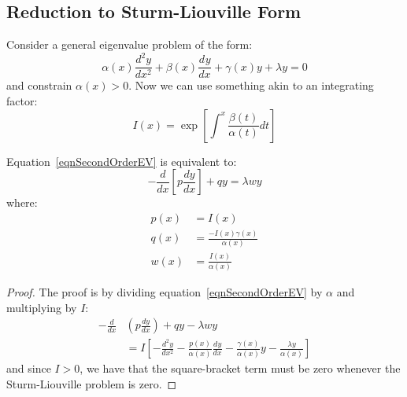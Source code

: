 \documentclass[../Main.tex]{subfiles}
\begin{document}
\subsection{Reduction to Sturm-Liouville Form}
Consider a general eigenvalue problem of the form:
\begin{equation}
    \alpha(x) \frac{d^{2}y}{dx^{2}} + \beta(x) \frac{d^{}y}{dx^{}} + \gamma(x) y + \lambda y = 0
    \label{eqnSecondOrderEV}
\end{equation}
and constrain $\alpha(x) > 0$. Now we can use something akin to an integrating factor:
\begin{equation*}
    I(x) = \exp\left[\int^x \frac{\beta(t)}{\alpha(t)}dt\right]
\end{equation*}
\begin{proposition}
    Equation~\ref{eqnSecondOrderEV} is equivalent to:
    \begin{equation*}
        -\frac{d}{dx}\left[p \frac{dy}{dx}\right] + qy = \lambda w y
    \end{equation*}
    where:
    \begin{align*}
        p(x) &= I(x) \\
        q(x) &= \frac{-I(x) \gamma(x)}{\alpha(x)} \\
        w(x) &= \frac{I(x)}{\alpha(x)}
    \end{align*}
    \label{propEVPropEquiv}
\end{proposition}
\begin{proof}
    The proof is by dividing equation~\ref{eqnSecondOrderEV} by $\alpha$ and multiplying by $I$:
    \begin{align*}
        -\frac{d}{dx}&\left(p \frac{dy}{dx}\right) + qy - \lambda w y \\
        &= I\left[-\frac{d^{2}y}{dx^{2}} - \frac{p(x)}{\alpha(x)} \frac{d^{}y}{dx^{}}- \frac{\gamma(x)}{\alpha(x)} y - \frac{\lambda y}{\alpha(x)}\right]
    \end{align*}
    and since $I > 0$, we have that the square-bracket term must be zero whenever the Sturm-Liouville problem is zero.
\end{proof}
\end{document}
